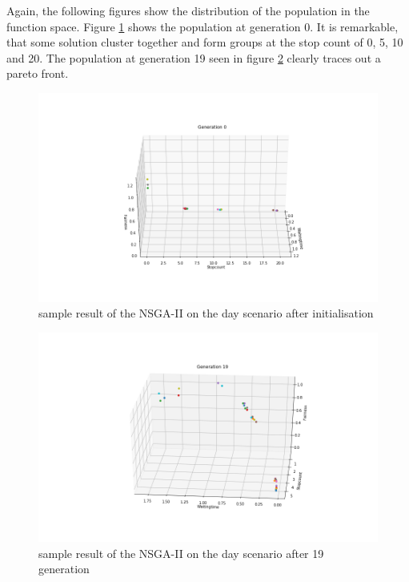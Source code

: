 \documentclass[./\jobname.tex]{subfiles}
\begin{document}
Again, the following figures show the distribution of the population in the function space. Figure \ref{fig:exp_nsga2_day_result_g0} shows the population at generation 0. It is remarkable, that some solution cluster together and form groups at the stop count of 0, 5, 10 and 20. The population at generation 19 seen in figure \ref{fig:exp_nsga2_day_result_g19} clearly traces out a pareto front. 

\begin{figure}[H]
	\centering
	\includegraphics[width=\textwidth]{../img/png/nsga2_day_0.png}
	\caption{sample result of the NSGA-II on the day scenario after initialisation}
	\label{fig:exp_nsga2_day_result_g0}
\end{figure}


\begin{figure}[H]
	\centering
	\includegraphics[width=\textwidth]{../img/png/nsga2_day_19.png}
	\caption{sample result of the NSGA-II on the day scenario after 19 generation}
	\label{fig:exp_nsga2_day_result_g19}
\end{figure}
\end{document}
